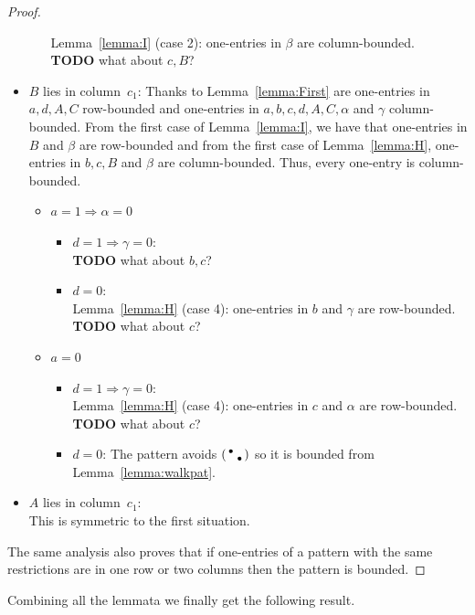 \begin{proof}
\begin{itemize}
\begin{itemize}
			Lemma~\ref{lemma:I} (case 2): one-entries in $\beta$ are column-bounded.\\
			\textbf{TODO} what about $c,B$?
	\end{itemize}
\item $B$ lies in column~$c_1$: Thanks to Lemma~\ref{lemma:First} are one-entries in $a,d,A,C$ row-bounded and one-entries in $a,b,c,d,A,C,\alpha$ and $\gamma$ column-bounded. From the first case of Lemma~\ref{lemma:I}, we have that one-entries in $B$ and $\beta$ are row-bounded and from the first case of Lemma~\ref{lemma:H}, one-entries in $b,c,B$ and $\beta$ are column-bounded. Thus, every one-entry is column-bounded.
	\begin{itemize}
		\item $a=1\Rightarrow\alpha=0$
			\begin{itemize}
				\item $d=1\Rightarrow\gamma=0$:\\
					\textbf{TODO} what about $b,c$?\\
				\item $d=0$:\\
					Lemma~\ref{lemma:H} (case 4): one-entries in $b$ and $\gamma$ are row-bounded.\\
					\textbf{TODO} what about $c$?
			\end{itemize}
		\item $a=0$
			\begin{itemize}
				\item $d=1\Rightarrow\gamma=0$:\\
					Lemma~\ref{lemma:H} (case 4): one-entries in $c$ and $\alpha$ are row-bounded.\\
					\textbf{TODO} what about $c$?
				\item $d=0$: The pattern avoids $\left(\begin{smallmatrix}\bullet& \\ &\bullet\end{smallmatrix}\right)$ so it is bounded from Lemma~\ref{lemma:walkpat}.
			\end{itemize}
	\end{itemize}
\item $A$ lies in column~$c_1$:\\
	This is symmetric to the first situation.
\end{itemize}
The same analysis also proves that if one-entries of a pattern with the same restrictions are in one row or two columns then the pattern is bounded.
\end{proof}

Combining all the lemmata we finally get the following result.


